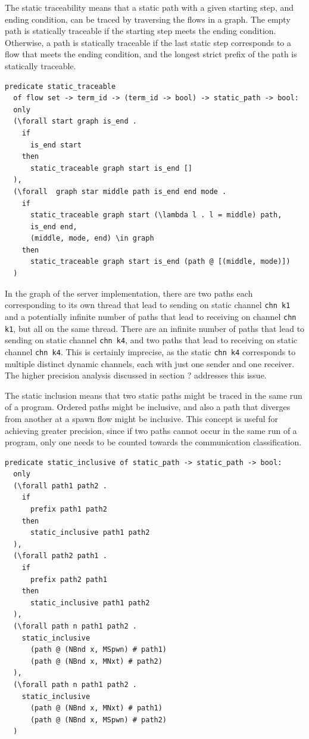 \documentclass[10pt]{article}
\begin{document}
The static traceability means that a static path with a given starting step, and ending
condition, can be traced by traversing the flows in a graph.
The empty path is statically traceable if the starting step meets the ending condition.
Otherwise, a path is statically traceable if the last static step corresponds to a flow
that meets the ending condition, and the longest strict prefix of the path is statically
traceable.  

\begin{lstlisting}[language=logic, mathescape]
  predicate static_traceable
  of flow set -> term_id -> (term_id -> bool) -> static_path -> bool:
  only
  (\forall start graph is_end .
    if
      is_end start
    then
      static_traceable graph start is_end []
  ),
  (\forall  graph star middle path is_end end mode .
    if 
      static_traceable graph start (\lambda l . l = middle) path, 
      is_end end, 
      (middle, mode, end) \in graph 
    then
      static_traceable graph start is_end (path @ [(middle, mode)])
  )
\end{lstlisting}

In the graph of the server implementation, there are two paths each corresponding to its
own thread that lead
to sending on
static channel \lstinline[language=sugar_lang]{chn k1} and a potentially infinite number of
paths that lead to receiving on
channel \lstinline[language=sugar_lang]{chn k1}, but all on the same thread.
There are an infinite number of paths that lead
to sending on static channel \lstinline[language=sugar_lang]{chn k4}, and two paths
that lead to receiving on static channel
\lstinline[language=sugar_lang]{chn k4}. This is certainly imprecise,
as the static \lstinline[language=sugar_lang]{chn k4} corresponds to
multiple distinct dynamic channels, each with just one sender and one receiver.  The higher
precision analysis discussed in section ? addresses this issue.


The static inclusion means that two static paths might be traced in
the same run of a program. Ordered paths might be inclusive, and also a path that diverges
from another at a spawn flow might be inclusive. This concept is useful for achieving
greater precision, since if two paths cannot occur in the same run of a program, only one needs
to be counted towards the communication classification. 

\begin{lstlisting}[language=logic, mathescape]
  predicate static_inclusive of static_path -> static_path -> bool:
  only
  (\forall path1 path2 .
    if
      prefix path1 path2
    then
      static_inclusive path1 path2
  ),
  (\forall path2 path1 .
    if
      prefix path2 path1
    then
      static_inclusive path1 path2
  ),
  (\forall path n path1 path2 .
    static_inclusive
      (path @ (NBnd x, MSpwn) # path1)
      (path @ (NBnd x, MNxt) # path2)
  ),
  (\forall path n path1 path2 .
    static_inclusive
      (path @ (NBnd x, MNxt) # path1)
      (path @ (NBnd x, MSpwn) # path2)
  )
\end{lstlisting}
\end{document}
